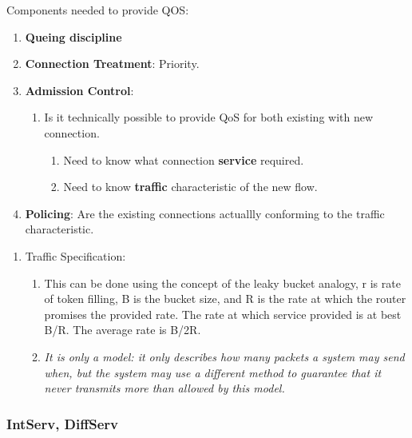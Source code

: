 \documentclass[11pt, a4paper]{article}
\begin{document}
Components needed to provide QOS:
\begin{enumerate}
    \item \textbf{Queing discipline}
    \item \textbf{Connection Treatment}: Priority.
    \item \textbf{Admission Control}:
    \begin{enumerate}
        \item Is it technically possible to provide QoS for both existing with new connection.
        \begin{enumerate}
            \item Need to know what connection \textbf{service} required.
            \item Need to know \textbf{traffic} characteristic of the new flow.
        \end{enumerate}
    \end{enumerate}
    \item \textbf{Policing}: Are the existing connections actuallly conforming to the traffic characteristic.
\end{enumerate}

\begin{enumerate}
    \item Traffic Specification:
    \begin{enumerate}
        \item This can be done using the concept of the leaky bucket analogy, r is rate of token filling, B is the bucket size, and R is the rate at which the router promises the provided rate. The rate at which service provided is at best B/R. The average rate is B/2R.
        \item \textit{It is only a model: it only describes how many packets a system may send when, but the system may use a different method to guarantee that it never transmits more than allowed by this model.}
    \end{enumerate}
\end{enumerate}

\subsubsection{IntServ, DiffServ}
\end{document}
